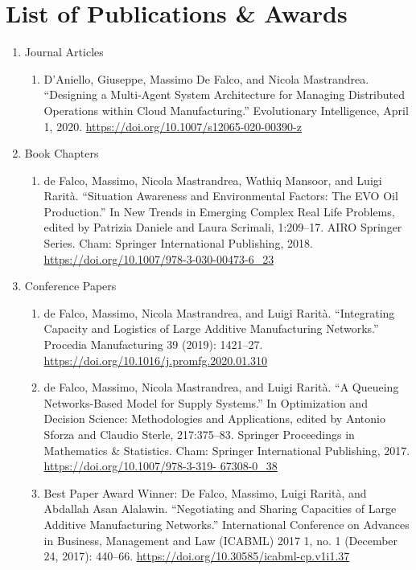 \chapter*{List of Publications \& Awards}
\begin{enumerate}
    \item Journal Articles
        \begin{enumerate}
            \item D’Aniello, Giuseppe, Massimo De Falco, and Nicola Mastrandrea. “Designing a Multi-Agent System Architecture for Managing Distributed Operations within Cloud Manufacturing.” Evolutionary Intelligence, April 1, 2020. \href{https://doi.org/10.1007/s12065-020-00390-z}{https://doi.org/10.1007/s12065-020-00390-z}
        \end{enumerate}
    \item Book Chapters
        \begin{enumerate}
            \item de Falco, Massimo, Nicola Mastrandrea, Wathiq Mansoor, and Luigi Rarità. “Situation Awareness and Environmental Factors: The EVO Oil Production.” In New Trends in Emerging Complex Real Life Problems, edited by Patrizia Daniele and Laura Scrimali, 1:209–17. AIRO Springer Series. Cham: Springer International Publishing, 2018. \href{https://doi.org/10.1007/978-3-030-00473-6\_23}{https://doi.org/10.1007/978-3-030-00473-6\_23}
        \end{enumerate}
    \item Conference Papers
        \begin{enumerate}
            \item de Falco, Massimo, Nicola Mastrandrea, and Luigi Rarità. “Integrating Capacity and Logistics of Large Additive Manufacturing Networks.” Procedia Manufacturing 39 (2019): 1421–27.\\ \href{https://doi.org/10.1016/j.promfg.2020.01.310}{https://doi.org/10.1016/j.promfg.2020.01.310}
            \item de Falco, Massimo, Nicola Mastrandrea, and Luigi Rarità. “A Queueing Networks-Based Model for Supply Systems.” In Optimization and Decision Science: Methodologies and Applications, edited by Antonio Sforza and Claudio Sterle, 217:375–83. Springer Proceedings in Mathematics \& Statistics. Cham: Springer International Publishing, 2017. \href{https://doi.org/10.1007/978-3-319- 67308-0\_38}{https://doi.org/10.1007/978-3-319- 67308-0\_38}
            \item Best Paper Award Winner: De Falco, Massimo, Luigi Rarità, and Abdallah Asan Alalawin. “Negotiating and Sharing Capacities of Large Additive Manufacturing Networks.” International Conference on Advances in Business, Management and Law (ICABML) 2017 1, no. 1 (December 24, 2017): 440–66. \href{https://doi.org/10.30585/icabml-cp.v1i1.37}{https://doi.org/10.30585/icabml-cp.v1i1.37}
        \end{enumerate}
\end{enumerate}
